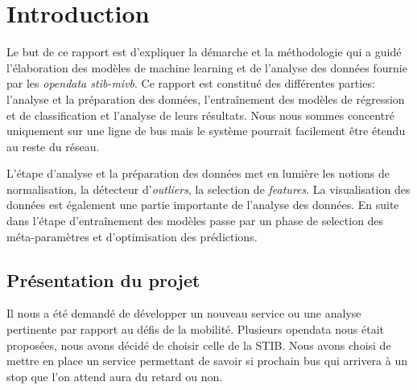 \chapter{Introduction}
Le but de ce rapport est d'expliquer la démarche et la méthodologie qui a guidé l'élaboration des modèles de machine learning et de l'analyse des données fournie par les \textit{opendata stib-mivb}. Ce rapport est constitué des différentes parties: l'analyse et la préparation des données, l'entraînement des modèles de régression et de classification et l'analyse de leurs résultats. Nous nous sommes concentré uniquement sur une ligne de bus mais le système pourrait facilement être étendu au reste du réseau.

L'étape d'analyse et la préparation des données met en lumière les notions de normalisation, la détecteur d'\textit{outliers}, la selection de \textit{features}. La visualisation des données est également une partie importante de l'analyse des données. En suite dans l'étape d'entraînement des modèles passe par un phase de selection des méta-paramètres et d'optimisation des prédictions.

\section{Présentation du projet}
Il nous a été demandé de développer un nouveau service ou une analyse pertinente par rapport au défis de la mobilité. Plusieurs opendata nous était proposées, nous avons décidé de choisir celle de la STIB. Nous avons choisi de mettre en place un service permettant de savoir si prochain bus qui arrivera à un stop que l'on attend aura du retard ou non.